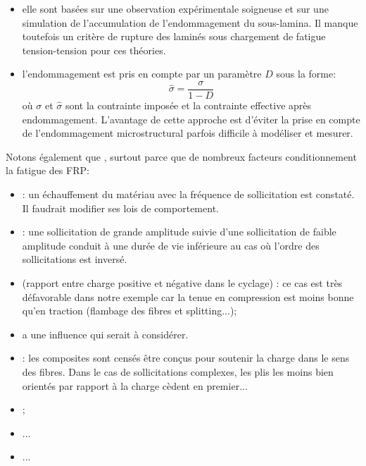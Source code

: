 \begin{itemize}
   \item {} elle sont basées
         sur une observation expérimentale soigneuse et sur une
         simulation de l'accumulation de l'endommagement du
         sous-lamina.
         Il manque toutefois un critère de rupture des laminés sous
         chargement de fatigue tension-tension pour ces théories.
   \item {} l'endommagement
         est pris en compte par un paramètre $D$ sous la forme:
         \begin{equation}
            \widehat{\sigma}=\dfrac{\sigma}{1-D}
         \end{equation}
         où $\sigma$ et $\widehat{\sigma}$ sont la contrainte
         imposée et la contrainte effective après endommagement.
         L'avantage de cette approche est d'éviter la prise en
         compte de l'endommagement microstructural parfois difficile
         à modéliser et mesurer.
\end{itemize}


\medskip
Notons également que , surtout parce que de nombreux facteurs conditionnement la fatigue des FRP:
\begin{itemize}
	\item {}: un échauffement du matériau avec la fréquence de sollicitation est
		constaté. Il faudrait modifier ses lois de comportement.
	\item {}: une sollicitation de grande amplitude suivie d'une sollicitation de faible amplitude
		conduit à une durée de vie inférieure au cas où l'ordre des sollicitations est
		inversé.
	\item {} (rapport entre charge positive et négative dans le cyclage) : ce cas est très
		défavorable dans notre exemple car la tenue en compression est moins bonne qu'en
		traction (flambage des fibres et splitting...);
	\item {} a une influence qui serait à considérer.
	\item {}: les composites sont censés être conçus pour soutenir la
		charge dans le sens des fibres. Dans le cas de sollicitations complexes, les plis les
		moins bien orientés par rapport à la charge cèdent en premier...
	\item {};
	\item {}...
	\item ...
\end{itemize}

